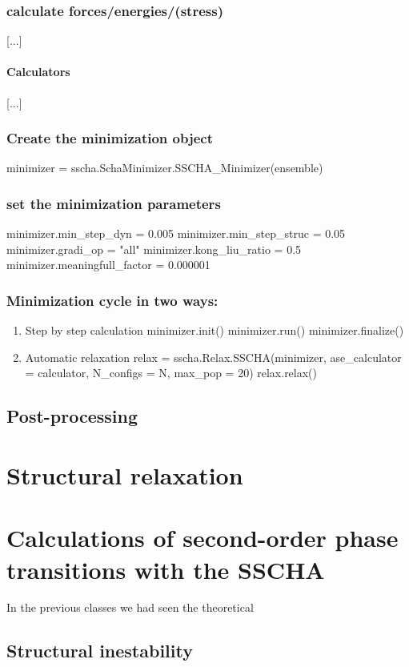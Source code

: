 \documentclass[]{report}
\begin{document}
\subsection{calculate forces/energies/(stress)}
[...]
\subsubsection{Calculators}
[...]
\subsection{Create the minimization object}
minimizer = sscha.SchaMinimizer.SSCHA\_Minimizer(ensemble)
\subsection{set the minimization parameters}
minimizer.min\_step\_dyn = 0.005
minimizer.min\_step\_struc = 0.05
minimizer.gradi\_op = "all"
minimizer.kong\_liu\_ratio = 0.5
minimizer.meaningfull\_factor = 0.000001

\subsection{Minimization cycle in two ways:}
\begin{enumerate}
	\item Step by step calculation
	minimizer.init()
	minimizer.run()
	minimizer.finalize()
	\item Automatic relaxation
	relax = sscha.Relax.SSCHA(minimizer, ase\_calculator = calculator, N\_configs = N, max\_pop = 20)
	relax.relax()
\end{enumerate}

\section{Post-processing}



\chapter{Structural relaxation}

\chapter{Calculations of second-order phase transitions with the SSCHA}
In the previous classes we had seen the theoretical 
\section{Structural inestability}
\end{document}
